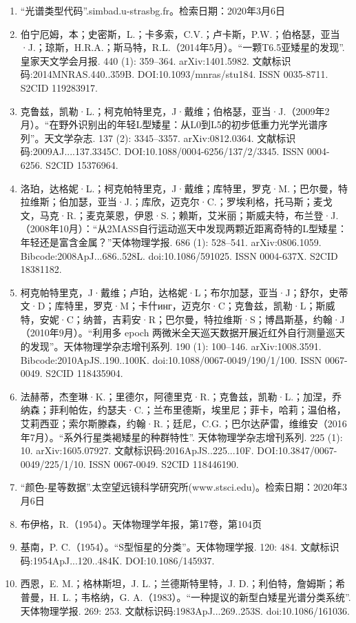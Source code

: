 \begin{enumerate}
\item “光谱类型代码”.simbad.u-strasbg.fr。检索日期：2020年3月6日
\item 伯宁厄姆，本；史密斯，L.；卡多索，C.V.；卢卡斯，P.W.；伯格瑟，亚当·J.；琼斯，H.R.A.；斯马特，R.L.（2014年5月）。“一颗T6.5亚矮星的发现”. 皇家天文学会月报. 440 (1): 359–364. arXiv:1401.5982. 文献标识码:2014MNRAS.440..359B. DOI:10.1093/mnras/stu184. ISSN 0035-8711. S2CID 119283917.
\item 克鲁兹，凯勒·L.；柯克帕特里克，J·戴维；伯格瑟，亚当·J.（2009年2月）。“在野外识别出的年轻L型矮星：从L0到L5的初步低重力光学光谱序列”。天文学杂志. 137 (2): 3345–3357. arXiv:0812.0364. 文献标识码:2009AJ....137.3345C. DOI:10.1088/0004-6256/137/2/3345. ISSN 0004-6256. S2CID 15376964.
\item 洛珀，达格妮·L.；柯克帕特里克，J·戴维；库特里，罗克·M.；巴尔曼，特拉维斯；伯加瑟，亚当·J.；库欣，迈克尔·C.；罗埃利格，托马斯；麦戈文，马克·R.；麦克莱恩，伊恩·S.；赖斯，艾米丽；斯威夫特，布兰登·J.（2008年10月）：“从2MASS自行运动巡天中发现两颗近距离奇特的L型矮星：年轻还是富含金属？”天体物理学报. 686 (1): 528–541. arXiv:0806.1059. Bibcode:2008ApJ...686..528L. doi:10.1086/591025. ISSN 0004-637X. S2CID 18381182.
\item 柯克帕特里克，J·戴维；卢珀，达格妮·L；布尔加瑟，亚当·J；舒尔，史蒂文·D；库特里，罗克·M；卡什инг，迈克尔·C；克鲁兹，凯勒·L；斯威特，安妮·C；纳普，吉莉安·R；巴尔曼，特拉维斯·S；博昌斯基，约翰·J（2010年9月）。“利用多 epoch 两微米全天巡天数据开展近红外自行测量巡天的发现”。天体物理学杂志增刊系列. 190 (1): 100–146. arXiv:1008.3591. Bibcode:2010ApJS..190..100K. doi:10.1088/0067-0049/190/1/100. ISSN 0067-0049. S2CID 118435904.
\item 法赫蒂，杰奎琳·K.；里德尔，阿德里克·R.；克鲁兹，凯勒·L.；加涅，乔纳森；菲利帕佐，约瑟夫·C.；兰布里德斯，埃里尼；菲卡，哈莉；温伯格，艾莉西亚；索尔斯滕森，约翰·R.；廷尼，C.G.；巴尔达萨雷，维维安（2016年7月）。“系外行星类褐矮星的种群特性”. 天体物理学杂志增刊系列. 225 (1): 10. arXiv:1605.07927. 文献标识码:2016ApJS..225...10F. DOI:10.3847/0067-0049/225/1/10. ISSN 0067-0049. S2CID 118446190.
\item “颜色-星等数据”.太空望远镜科学研究所(www.stsci.edu)。检索日期：2020年3月6日
\item 布伊格，R.（1954）。天体物理学年报，第17卷，第104页
\item 基南，P. C.（1954）。“S型恒星的分类”。天体物理学报. 120: 484. 文献标识码:1954ApJ...120..484K. DOI:10.1086/145937.
\item 西恩，E. M.；格林斯坦，J. L.；兰德斯特里特，J. D.；利伯特，詹姆斯；希普曼，H. L.；韦格纳，G. A.（1983）。“一种提议的新型白矮星光谱分类系统”. 天体物理学报. 269: 253. 文献标识码:1983ApJ...269..253S. doi:10.1086/161036.

\end{enumerate}
